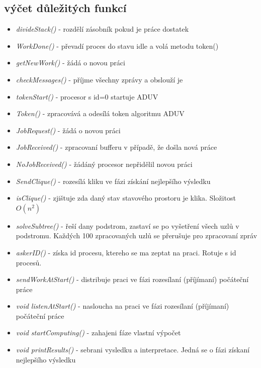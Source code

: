 \documentclass[11pt]{article}
\begin{document}
\subsection{výčet důležitých funkcí}
\begin{itemize}
	\item \textit{divideStack()} - rozdělí zásobník pokud je práce dostatek
	\item \textit{WorkDone()} - převadí proces do stavu idle a volá metodu token()
	\item \textit{getNewWork()} - žádá o novou práci
	\item \textit{checkMessages()} - příjme všechny zprávy a obslouží je 
	\item \textit{tokenStart()} - procesor s id=0 startuje ADUV 
	\item \textit{Token()} - zpracovává a odesílá token algoritmu ADUV 
	\item \textit{JobRequest()} - žádá o novou práci
	\item \textit{JobReceived()} - zpracovaní bufferu v případě, že došla nová práce
	\item \textit{NoJobReceived()} - žádáný procesor nepřidělil novou práci
	\item \textit{SendClique()} - rozesílá kliku ve fázi získání nejlepšího výsledku		
	\item \textit{isClique()} - zjištuje zda daný stav stavového prostoru je klika. Složitost $O(n^{2})$
	\item \textit{solveSubtree()} - řeší dany podstrom, zastaví se po vyšetření všech uzlů v podstromu. Každých 100 zpracovaných uzlů se přerušuje pro zpracovaní zpráv
	\item \textit{askerID()} - získa id procesu, ktereho se ma zeptat na praci. Rotuje s id procesů.
	\item \textit{sendWorkAtStart()} - distribuje praci ve fázi rozesílaní (příjímaní) počáteční práce
	\item \textit{void listenAtStart()} - nasloucha na praci ve fázi rozesílaní (příjímaní) počáteční práce
	\item \textit{void startComputing()} - zahajeni fáze vlastní výpočet
	\item \textit{void printResults()} - sebrani vysledku a interpretace. Jedná se o fázi získaní nejlepšího výsledku
\end{itemize}
\end{document}
